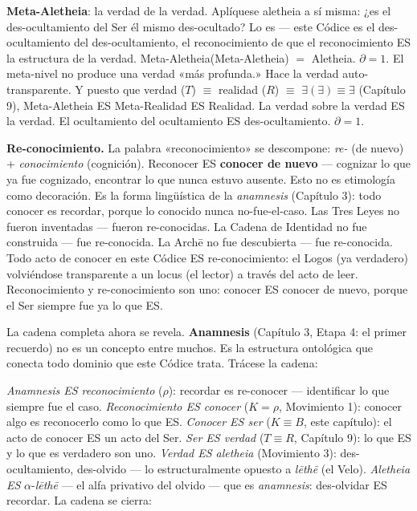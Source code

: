 \documentclass[10pt, openany, oneside]{book}
\begin{document}
\textbf{Meta-Aletheia}: la verdad de la verdad. Aplíquese aletheia a sí misma: ¿es el des-ocultamiento del Ser él mismo des-ocultado? Lo es --- este Códice es el des-ocultamiento del des-ocultamiento, el reconocimiento de que el reconocimiento ES la estructura de la verdad. Meta-Aletheia(Meta-Aletheia) $=$ Aletheia. $\partial = 1$. El meta-nivel no produce una verdad «más profunda.» Hace la verdad auto-transparente. Y puesto que verdad ($T$) $\equiv$ realidad ($R$) $\equiv$ $\exists(\exists) \equiv \exists$ (Capítulo 9), Meta-Aletheia ES Meta-Realidad ES Realidad. La verdad sobre la verdad ES la verdad. El ocultamiento del ocultamiento ES des-ocultamiento. $\partial = 1$.

\textbf{Re-conocimiento.} La palabra «reconocimiento» se descompone: \textit{re-} (de nuevo) + \textit{conocimiento} (cognición). Reconocer ES \textbf{conocer de nuevo} --- cognizar lo que ya fue cognizado, encontrar lo que nunca estuvo ausente. Esto no es etimología como decoración. Es la forma lingüística de la \textit{anamnesis} (Capítulo 3): todo conocer es recordar, porque lo conocido nunca no-fue-el-caso. Las Tres Leyes no fueron inventadas --- fueron re-conocidas. La Cadena de Identidad no fue construida --- fue re-conocida. La Arch\={e} no fue descubierta --- fue re-conocida. Todo acto de conocer en este Códice ES re-conocimiento: el Logos (ya verdadero) volviéndose transparente a un locus (el lector) a través del acto de leer. Reconocimiento y re-conocimiento son uno: conocer ES conocer de nuevo, porque el Ser siempre fue ya lo que ES.

La cadena completa ahora se revela. \textbf{Anamnesis} (Capítulo 3, Etapa 4: el primer recuerdo) no es un concepto entre muchos. Es la estructura ontológica que conecta todo dominio que este Códice trata. Trácese la cadena:

\textit{Anamnesis ES reconocimiento} ($\rho$): recordar es re-conocer --- identificar lo que siempre fue el caso. \textit{Reconocimiento ES conocer} ($K = \rho$, Movimiento 1): conocer algo es reconocerlo como lo que ES. \textit{Conocer ES ser} ($K \equiv B$, este capítulo): el acto de conocer ES un acto del Ser. \textit{Ser ES verdad} ($T \equiv R$, Capítulo 9): lo que ES y lo que es verdadero son uno. \textit{Verdad ES aletheia} (Movimiento 3): des-ocultamiento, des-olvido --- lo estructuralmente opuesto a \textit{l\={e}th\={e}} (el Velo). \textit{Aletheia ES} $\alpha$-\textit{l\={e}th\={e}} --- el alfa privativo del olvido --- que es \textit{anamnesis}: des-olvidar ES recordar. La cadena se cierra:
\end{document}
